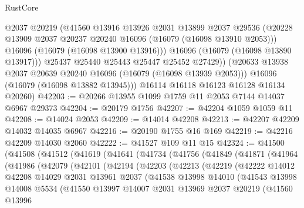 \begin{lexlean}{RustCore}
\begin{coremodule}
              @2037
              @20219
              (@41560
                @13916
                @13926
                @2031
                @13899
                @2037
                @29536
                (@20228 @13909 @2037 @20237 @20240 @16096 (@16079 (@16098 @13910 @2053)))
                @16096
                (@16079 (@16098 @13900 @13916)))
              @16096
              (@16079 (@16098 @13890 @13917)))
            @25437
            @25440
            @25443
            @25447
            @25452
            @27429))
        (@20633 @13938 @2037 @20639 @20240 @16096 (@16079 (@16098 @13939 @2053)))
        @16096
        (@16079 (@16098 @13882 @13945)))
      @16114
      @16118
      @16123
      @16128
      @16134
      @20260)
@42203 := @20266 @13955 @1099 @1759 @11 @2053 @7144 @14037 @6967 @29373
@42204 := @20179 @1756
@42207 := @42204 @1059 @1059 @11
@42208 := @14024 @2053
@42209 := @14014 @42208
@42213 := @42207 @42209 @14032 @14035 @6967
@42216 := @20190 @1755 @16 @169
@42219 := @42216 @42209 @14030 @2060
@42222 := @41527 @109 @11 @15
@42324 := @41500
    (@41508
      (@41512
        (@41619
          (@41641
            (@41734
              (@41756
                (@41849
                  (@41871
                    (@41964
                      (@41986
                        (@42079
                          (@42101
                            (@42194
                              (@42203
                                (@42213
                                  (@42219
                                    (@42222
                                      @14012
                                      @42208
                                      @14029
                                      @2031
                                      @13961
                                      @2037
                                      (@41538
                                        @13998
                                        @14010
                                        (@41543
                                          @13998
                                          @14008
                                          @5534
                                          (@41550
                                            @13997
                                            @14007
                                            @2031
                                            @13969
                                            @2037
                                            @20219
                                            (@41560
                                              @13996

\end{coremodule}
\end{lexlean}
